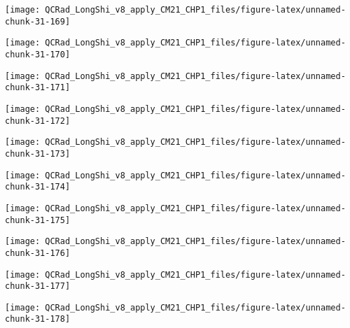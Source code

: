 \documentclass[
  10pt,
  a4paper,oneside]{article}
\begin{document}
\begin{center}\texttt{[image: QCRad\_LongShi\_v8\_apply\_CM21\_CHP1\_files/figure-latex/unnamed-chunk-31-169]} \end{center}

\begin{center}\texttt{[image: QCRad\_LongShi\_v8\_apply\_CM21\_CHP1\_files/figure-latex/unnamed-chunk-31-170]} \end{center}

\begin{center}\texttt{[image: QCRad\_LongShi\_v8\_apply\_CM21\_CHP1\_files/figure-latex/unnamed-chunk-31-171]} \end{center}

\begin{center}\texttt{[image: QCRad\_LongShi\_v8\_apply\_CM21\_CHP1\_files/figure-latex/unnamed-chunk-31-172]} \end{center}

\begin{center}\texttt{[image: QCRad\_LongShi\_v8\_apply\_CM21\_CHP1\_files/figure-latex/unnamed-chunk-31-173]} \end{center}

\begin{center}\texttt{[image: QCRad\_LongShi\_v8\_apply\_CM21\_CHP1\_files/figure-latex/unnamed-chunk-31-174]} \end{center}

\begin{center}\texttt{[image: QCRad\_LongShi\_v8\_apply\_CM21\_CHP1\_files/figure-latex/unnamed-chunk-31-175]} \end{center}

\begin{center}\texttt{[image: QCRad\_LongShi\_v8\_apply\_CM21\_CHP1\_files/figure-latex/unnamed-chunk-31-176]} \end{center}

\begin{center}\texttt{[image: QCRad\_LongShi\_v8\_apply\_CM21\_CHP1\_files/figure-latex/unnamed-chunk-31-177]} \end{center}

\begin{center}\texttt{[image: QCRad\_LongShi\_v8\_apply\_CM21\_CHP1\_files/figure-latex/unnamed-chunk-31-178]} \end{center}
\end{document}
